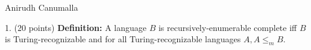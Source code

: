 \documentclass[programming]{../../mfcs}
\begin{document}
Anirudh Canumalla
\vspace{-2.5em}

\begin{question}{1. (20 points)}
    \textbf{Definition: } A language $B$ is recursively-enumerable complete iff $B$ is
    Turing-recognizable and for all Turing-recognizable languages $A, A \leq_m B $.
\end{question}
\end{document}
